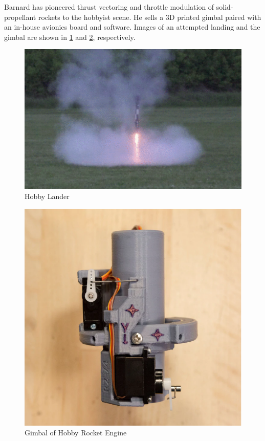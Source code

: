 Barnard has pioneered thrust vectoring and throttle modulation of solid-propellant rockets to the hobbyist scene. He sells a 3D printed gimbal paired with an in-house avionics board and software. Images of an attempted landing and the gimbal are shown in \ref{fig:HL} and \ref{fig:gimbal}, respectively. 

\begin{figure}[H]
    \centering
    \includegraphics[scale=0.5]{src/figs/HobbyLander.png}
    \caption{Hobby Lander}
    \label{fig:HL}
\end{figure}


\begin{figure}[H]
    \centering
    \includegraphics[scale=0.5]{src/figs/gimball.png}
    \caption{Gimbal of Hobby Rocket Engine}
    \label{fig:gimbal}
\end{figure}


